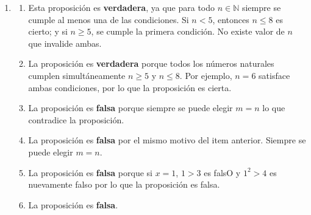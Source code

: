 \documentclass[11pt]{article}
\begin{document}
\begin{enumerate}[label=\roman*)]
    \item \begin{enumerate}
        \item Esta proposición es \textbf{verdadera}, ya que para todo $n \in \mathbb{N}$ siempre se cumple al menos una de las condiciones. 
        Si $n < 5$, entonces $n \leq 8$ es cierto; y si $n \geq 5$, se cumple la primera condición. 
        No existe valor de $n$ que invalide ambas.
        
        \item La proposición es \textbf{verdadera} porque todos los números naturales  cumplen simultáneamente $n \geq 5$ y $n \leq 8$. 
        Por ejemplo, $n=6$ satisface ambas condiciones, por lo que la proposición es cierta.

        \item La proposición es \textbf{falsa} porque siempre se puede elegir $m = n$ lo que contradice la proposición.

        \item La proposición es \textbf{falsa} por el mismo motivo del item anterior. Siempre se puede elegir $m = n$.

        \item La proposición es \textbf{falsa} porque si $x = 1$, $1 > 3$ es falsO y $1^{2} > 4$ es nuevamente falso por lo que la proposición es falsa.

        \item La proposición es \textbf{falsa}.
    \end{enumerate}


\end{enumerate}
\end{document}
